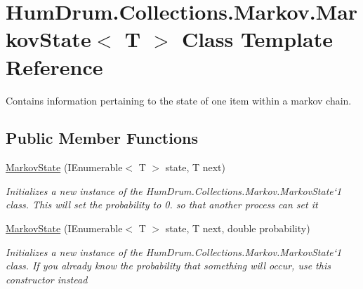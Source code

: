\hypertarget{classHumDrum_1_1Collections_1_1Markov_1_1MarkovState}{}\section{Hum\+Drum.\+Collections.\+Markov.\+Markov\+State$<$ T $>$ Class Template Reference}
\label{classHumDrum_1_1Collections_1_1Markov_1_1MarkovState}


Contains information pertaining to the state of one item within a markov chain.  


\subsection*{Public Member Functions}
\begin{DoxyCompactItemize}
\item 
\hyperlink{classHumDrum_1_1Collections_1_1Markov_1_1MarkovState_a9a0ab2d8e1f4e31c3317af0fe81251bf}{Markov\+State} (I\+Enumerable$<$ T $>$ state, T next)
\begin{DoxyCompactList}\small\item\em Initializes a new instance of the Hum\+Drum.\+Collections.\+Markov.\+Markov\+State`1 class. This will set the probability to 0. so that another process can set it \end{DoxyCompactList}\item 
\hyperlink{classHumDrum_1_1Collections_1_1Markov_1_1MarkovState_a710de5d361e56453e7c57c7597eb600d}{Markov\+State} (I\+Enumerable$<$ T $>$ state, T next, double probability)
\begin{DoxyCompactList}\small\item\em Initializes a new instance of the Hum\+Drum.\+Collections.\+Markov.\+Markov\+State`1 class. If you already know the probability that something will occur, use this constructor instead \end{DoxyCompactList}\end{DoxyCompactItemize}
